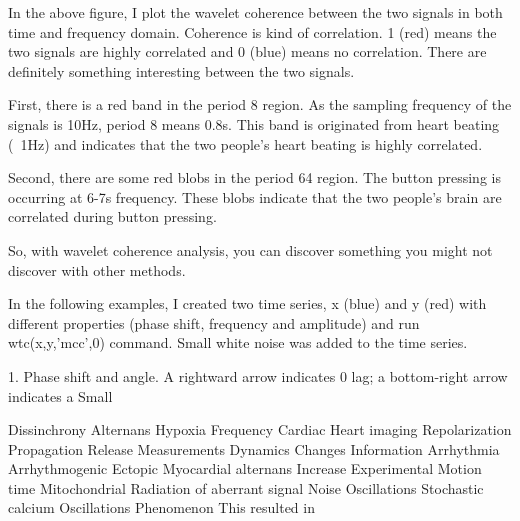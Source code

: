\documentclass{biophys-new}
\begin{document}
In the above figure, I plot the wavelet coherence between the two signals in both time and frequency domain. Coherence is kind of correlation. 1 (red) means the two signals are highly correlated and 0 (blue) means no correlation. There are definitely something interesting between the two signals.

First, there is a red band in the period 8 region. As the sampling frequency of the signals is 10Hz, period 8 means 0.8s. This band is originated from heart beating (~1Hz) and indicates that the two people’s heart beating is highly correlated.

Second, there are some red blobs in the period 64 region. The button pressing is occurring at 6-7s frequency. These blobs indicate that the two people’s brain are correlated during button pressing.

So, with wavelet coherence analysis, you can discover something you might not discover with other methods.

In the following examples, I created two time series, x (blue) and y (red) with different properties (phase shift, frequency and amplitude) and run wtc(x,y,’mcc’,0) command. Small white noise was added to the time series.

1. Phase shift and angle.
A rightward arrow indicates 0 lag; a bottom-right arrow indicates a Small


Dissinchrony
Alternans
Hypoxia
Frequency
Cardiac
Heart imaging
Repolarization
Propagation
Release
Measurements
Dynamics
Changes
Information
Arrhythmia
Arrhythmogenic
Ectopic
Myocardial alternans
Increase
Experimental
Motion time
Mitochondrial
Radiation of aberrant signal
Noise
Oscillations
Stochastic calcium Oscillations
Phenomenon
This resulted in
\end{document}
